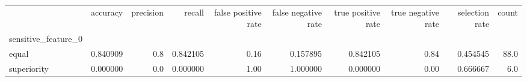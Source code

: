 \begin{tabular}{lrrrrrrrrr}
\toprule
{} &  accuracy &  precision &    recall &  false positive rate &  false negative rate &  true positive rate &  true negative rate &  selection rate &  count \\
sensitive\_feature\_0 &           &            &           &                      &                      &                     &                     &                 &        \\
\midrule
equal               &  0.840909 &        0.8 &  0.842105 &                 0.16 &             0.157895 &            0.842105 &                0.84 &        0.454545 &   88.0 \\
superiority         &  0.000000 &        0.0 &  0.000000 &                 1.00 &             1.000000 &            0.000000 &                0.00 &        0.666667 &    6.0 \\
\bottomrule
\end{tabular}
